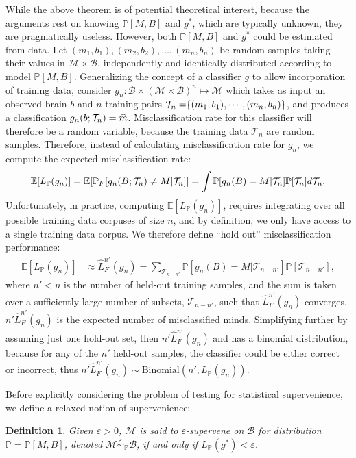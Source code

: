 \documentclass{article}
\newcommand{\mB}{\mathcal{B}}
\newcommand{\mM}{\mathcal{M}}
\newcommand{\PP}{\mathbb{P}}           %
\newcommand{\EE}{\mathbb{E}}           %
\providecommand{\mc}[1]{\mathcal{#1}}
\providecommand{\mh}[1]{\widehat{#1}}
\newcommand{\hL}{\widehat{L}}
\newcommand{\MeB}{\mM \overset{\varepsilon}{{\sim}}_{\PP} \mB}
\providecommand{\tr}[1]{\textcolor{black}{#1}}
\newtheorem{defi}{Definition}
\begin{document}
While the above theorem is of potential theoretical interest, because the arguments rest on knowing $\PP[M,B]$ and $g^*$, which are typically unknown, they are pragmatically useless.  However, both $\PP[M,B]$ and $g^*$ could be estimated from data.  Let $(m_1,b_1), (m_2,b_2), \ldots, (m_n,b_n)$ be random samples taking their values in $\mc{M} \times \mc{B}$, independently and identically distributed according to model $\PP[M,B]$.  Generalizing the concept of a classifier $g$ to allow incorporation of training data, consider $g_n:\mB \times (\mc{M} \times \mc{B})^n \mapsto \mM$ which takes as input an observed brain  $b$ and $n$ training pairs $\tr{\mc{T}_n=}\{(m_1,b_1),\cdots,(m_n,b_n)\}$, and produces a classification $g_n(b;\tr{\mc{T}_n})=\mh{m}$.  Misclassification rate for this classifier will therefore be a random variable, because the training data $\mc{T}_n$ are random samples.  Therefore, instead of calculating misclassification rate for $g_n$, we compute the expected misclassification rate: %
\begin{align}
\EE[L_{\PP}(g_n)] = \EE[\PP_F[g_n(B;\tr{\mc{T}_n}) \neq M|\tr{\mc{T}_n}]] = \int \PP[g_n(B)=M | \mc{T}_n] \PP[\mc{T}_n] d\mc{T}_n.
\end{align}
Unfortunately, in practice, computing $\EE[L_{\PP}(g_n)]$, requires integrating over all possible training data corpuses of size $n$, and by definition, we only have access to a single training data corpus.  We therefore define ``hold out'' misclassification performance:
\begin{align}
\EE[L_{\PP}(g_n)] %
&\approx  \hL^{n'}_{F}(g_n) = \sum_{\mc{T}_{n-n'}} \PP[g_n(B)=M | \mc{T}_{n-n'}] \PP[\mc{T}_{n-n'}],
\end{align}
where $n'<n$ is the number of held-out training samples, and the sum is taken over a sufficiently large number of subsets, $\mc{T}_{n-n'}$, such that $\hL^{n'}_F(g_n)$ converges.   $n' \hL^{n'}_{F}(g_n)$ is the expected number of misclassified minds.  Simplifying further by assuming just one hold-out set, then $n' \hL^{n'}_{F}(g_n)$ and has a binomial distribution, because for any of the $n'$ held-out samples, the classifier could be either correct or incorrect, thus $n' \hL^{n'}_{F}(g_n) \sim \text{Binomial}(n',L_{\PP}(g_n))$.

Before explicitly considering the problem of testing for statistical supervenience, we define a relaxed notion of supervenience:
\begin{defi}
\label{def2}
Given $\varepsilon > 0$, $\mM$ is said to $\varepsilon$-\textit{supervene} on $\mB$ for distribution $\PP=\PP[M,B]$, denoted $\MeB$, if and only if $L_{\PP}(g^*) < \varepsilon$.
\end{defi}
\end{document}

